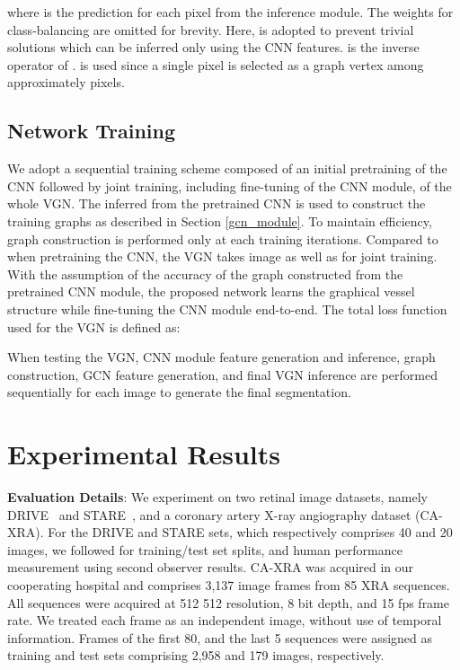 \documentclass[runningheads,a4paper]{llncs}
\begin{document}
where  is the prediction for each pixel  from the inference module. The weights for class-balancing are omitted for brevity. Here,  is adopted to prevent trivial solutions which can be inferred only using the CNN features.  is the inverse operator of .  is used since a single pixel is selected as a graph vertex among approximately  pixels.

\subsection{Network Training}\label{net_training}

We adopt a sequential training scheme composed of an initial pretraining of the CNN followed by joint training, including fine-tuning of the CNN module, of the whole VGN. The  inferred from the pretrained CNN is used to construct the training graphs as described in Section \ref{gcn_module}. To maintain efficiency, graph construction is performed only at each  training iterations. Compared to when pretraining the CNN, the VGN takes image  as well as  for joint training. With the assumption of the accuracy of the graph  constructed from the pretrained CNN module, the proposed network learns the graphical vessel structure while fine-tuning the CNN module end-to-end. The total loss function used for the VGN is defined as:



When testing the VGN, CNN module feature generation and inference, graph construction, GCN feature generation, and final VGN inference are performed sequentially for each image to generate the final segmentation. 

\section{Experimental Results}

\textbf{Evaluation Details}:
We experiment on two retinal image datasets, namely DRIVE~\cite{staal04} and STARE~\cite{hoover00}, and a coronary artery X-ray angiography dataset (CA-XRA). For the DRIVE and STARE sets, which respectively comprises 40 and 20 images, we followed \cite{maninis16} for training/test set splits, and human performance measurement using second observer results. CA-XRA was acquired in our cooperating hospital and comprises 3,137 image frames from 85 XRA sequences. All sequences were acquired at 512  512 resolution, 8 bit depth, and 15 fps frame rate. We treated each frame as an independent image, without use of temporal information. Frames of the first 80, and the last 5 sequences were assigned as training and test sets comprising 2,958 and 179 images, respectively.
\end{document}
